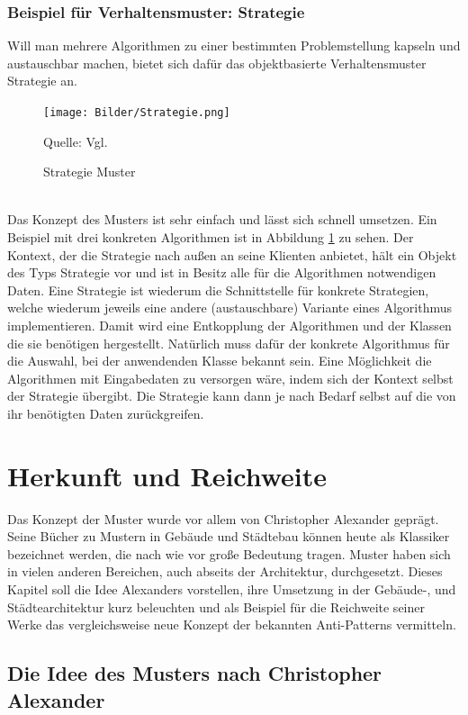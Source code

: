 \documentclass[fontsize=11pt,a4paper,final]{scrreprt}[2003/01/01]
\newcommand*{\quelle}{%
	\footnotesize Quelle: 
}
\begin{document}
\subsection{Beispiel für Verhaltensmuster: Strategie}
Will man mehrere Algorithmen zu einer bestimmten Problemstellung kapseln und austauschbar machen, bietet sich dafür das objektbasierte Verhaltensmuster Strategie an.

\begin{figure}[H]
	\centering
	\texttt{[image: Bilder/Strategie.png]}
	\caption{Strategie Muster}
	\quelle{Vgl. \cite[S. 375]{gamma2004}} 
	\label{fig:Strategie}
\end{figure}
\ \\
Das Konzept des Musters ist sehr einfach und lässt sich schnell umsetzen. Ein Beispiel mit drei konkreten Algorithmen ist in Abbildung \ref{fig:Strategie} zu sehen. Der Kontext, der die Strategie nach außen an seine Klienten anbietet, hält ein Objekt des Typs Strategie vor und ist in Besitz alle für die Algorithmen notwendigen Daten. Eine Strategie ist wiederum die Schnittstelle für konkrete Strategien, welche wiederum jeweils eine andere (austauschbare) Variante eines Algorithmus implementieren. Damit wird eine Entkopplung der Algorithmen und der Klassen die sie benötigen hergestellt. Natürlich muss dafür der konkrete Algorithmus für die Auswahl, bei der anwendenden Klasse bekannt sein. Eine Möglichkeit die Algorithmen mit Eingabedaten zu versorgen wäre, indem sich der Kontext selbst der Strategie übergibt. Die Strategie kann dann je nach Bedarf selbst auf die von ihr benötigten Daten zurückgreifen.

\chapter{Herkunft und Reichweite}\label{Muster}
Das Konzept der Muster wurde vor allem von Christopher Alexander geprägt. Seine Bücher zu Mustern in Gebäude und Städtebau können heute als Klassiker bezeichnet werden, die nach wie vor große Bedeutung tragen. Muster haben sich in vielen anderen Bereichen, auch abseits der Architektur, durchgesetzt. Dieses Kapitel soll die Idee Alexanders vorstellen, ihre Umsetzung in der Gebäude-, und Städtearchitektur kurz beleuchten und als Beispiel für die Reichweite seiner Werke das vergleichsweise neue Konzept der bekannten Anti-Patterns vermitteln.

\section{Die Idee des Musters nach Christopher Alexander}
\cite{Alexander1977}
\end{document}
